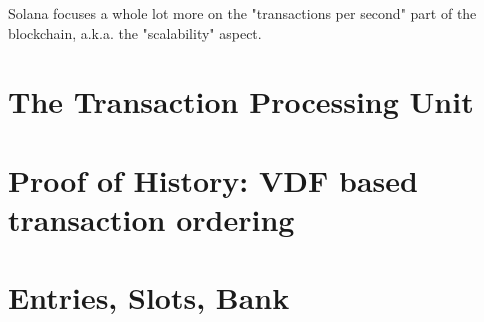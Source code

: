 Solana focuses a whole lot more on the "transactions per second" part of the blockchain, a.k.a. the "scalability" aspect.


\section{The Transaction Processing Unit}
\section{Proof of History: VDF based transaction ordering}
\section{Entries, Slots, Bank}
